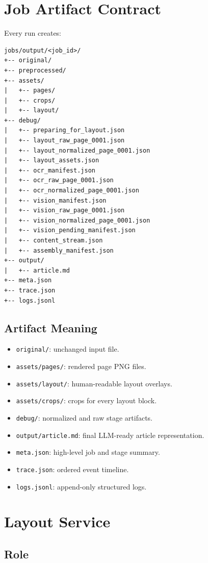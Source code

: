 \documentclass[11pt,a4paper]{article}
\begin{document}
\section{Job Artifact Contract}

Every run creates:

\begin{lstlisting}
jobs/output/<job_id>/
+-- original/
+-- preprocessed/
+-- assets/
|   +-- pages/
|   +-- crops/
|   +-- layout/
+-- debug/
|   +-- preparing_for_layout.json
|   +-- layout_raw_page_0001.json
|   +-- layout_normalized_page_0001.json
|   +-- layout_assets.json
|   +-- ocr_manifest.json
|   +-- ocr_raw_page_0001.json
|   +-- ocr_normalized_page_0001.json
|   +-- vision_manifest.json
|   +-- vision_raw_page_0001.json
|   +-- vision_normalized_page_0001.json
|   +-- vision_pending_manifest.json
|   +-- content_stream.json
|   +-- assembly_manifest.json
+-- output/
|   +-- article.md
+-- meta.json
+-- trace.json
+-- logs.jsonl
\end{lstlisting}

\subsection{Artifact Meaning}

\begin{itemize}[leftmargin=1.2cm]
\item \texttt{original/}: unchanged input file.
\item \texttt{assets/pages/}: rendered page PNG files.
\item \texttt{assets/layout/}: human-readable layout overlays.
\item \texttt{assets/crops/}: crops for every layout block.
\item \texttt{debug/}: normalized and raw stage artifacts.
\item \texttt{output/article.md}: final LLM-ready article representation.
\item \texttt{meta.json}: high-level job and stage summary.
\item \texttt{trace.json}: ordered event timeline.
\item \texttt{logs.jsonl}: append-only structured logs.
\end{itemize}

\section{Layout Service}

\subsection{Role}
\end{document}

